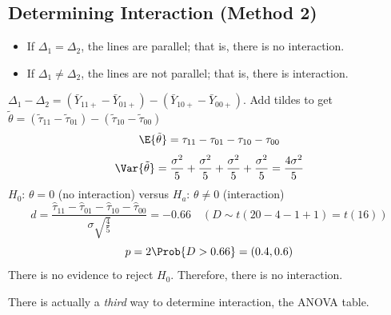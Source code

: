 \documentclass[oneside]{book}\usepackage[]{graphicx}\usepackage[dvipsnames,table,xcdraw]{xcolor}
\begin{document}
\subsection{Determining Interaction (Method 2)}
\begin{itemize}
    \item If $ \Delta_1=\Delta_2 $, the lines are parallel; that is, there is no interaction.
    \item If $ \Delta_1\ne \Delta_2 $, the lines are not parallel; that is, there is interaction.
\end{itemize}
$ \Delta_1-\Delta_2=(\bar{Y}_{11+}-\bar{Y}_{01+})-(\bar{Y}_{10+}-\bar{Y}_{00+}) $.
Add tildes to get $ \tilde{\theta}=(\tilde{\tau}_{11}-\tilde{\tau}_{01})-(\tilde{\tau}_{10}-\tilde{\tau}_{00}) $
\[ \E{\tilde{\theta}}=\tau_{11}-\tau_{01}-\tau_{10}-\tau_{00} \]
\[ \Var{\tilde{\theta}}=\frac{\sigma^2}{5} +\frac{\sigma^2}{5} +\frac{\sigma^2}{5} +\frac{\sigma^2}{5}
    =\frac{4\sigma^2}{5}  \]
$ H_0 $: $ \theta=0 $ (no interaction) versus $ H_a $: $ \theta\ne 0 $ (interaction)
\[ d=\frac{\hat{\tau}_{11}-\hat{\tau}_{01}-\hat{\tau}_{10}-\hat{\tau}_{00}}{\sigma\sqrt{\frac{4}{5}}}=-0.66\quad(D \sim t(20-4-1+1)=t(16)) \]
\[ p=2\Prob{D>0.66}=(0.4,0.6) \]
There is no evidence to reject $ H_0 $. Therefore, there is no interaction.

There is actually a \emph{third} way to determine interaction, the ANOVA table.
\end{document}
